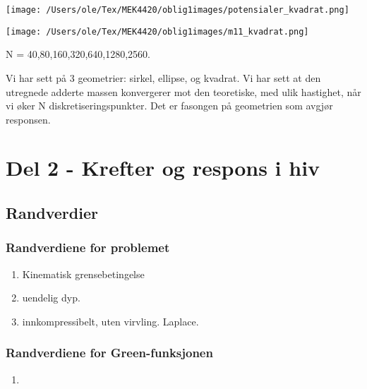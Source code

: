 \documentclass{beamer}
\begin{document}
\begin{frame}
\texttt{[image: /Users/ole/Tex/MEK4420/oblig1images/potensialer\_kvadrat.png]}
\end{frame}
\begin{frame}
\texttt{[image: /Users/ole/Tex/MEK4420/oblig1images/m11\_kvadrat.png]}
 
N = 40,80,160,320,640,1280,2560.
\end{frame}


\begin{frame}
Vi har sett på 3 geometrier: sirkel, ellipse, og kvadrat. Vi har sett at den utregnede adderte massen konvergerer mot den teoretiske, med ulik hastighet, når vi øker N diskretiseringspunkter. Det er fasongen på geometrien som avgjør responsen. 
\end{frame}




\section{Del 2 - Krefter og respons i hiv}
\subsection{Randverdier}
\begin{frame}
  \frametitle{Randverdiene for problemet}
  \begin{enumerate}
  \item Kinematisk grensebetingelse
  \item uendelig dyp.
  \item innkompressibelt, uten virvling. Laplace.      
  \end{enumerate}
\end{frame}
\begin{frame}
  \frametitle{Randverdiene for Green-funksjonen}
  \begin{enumerate}
  \item      
  \end{enumerate}
\end{frame}
\end{document}
